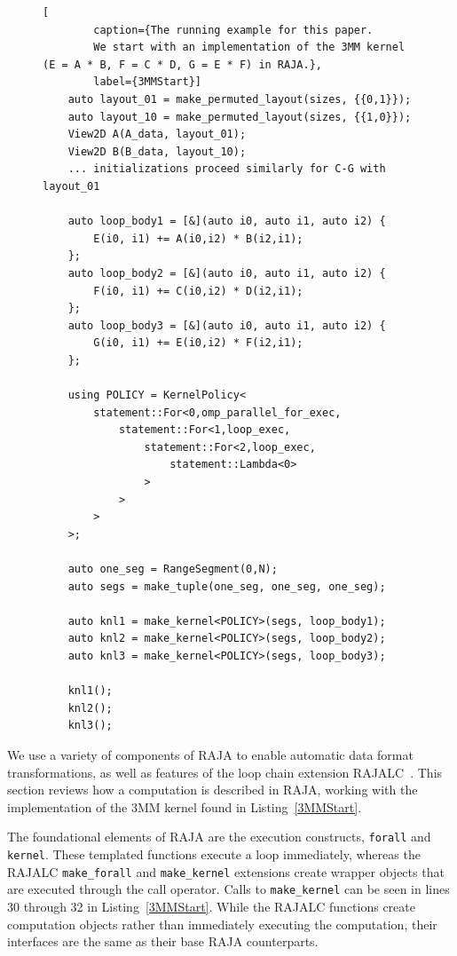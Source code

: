\documentclass[sigconf,review=true]{acmart}
\begin{document}
\begin{figure}
	\begin{lstlisting}[
		caption={The running example for this paper. 
		We start with an implementation of the 3MM kernel (E = A * B, F = C * D, G = E * F) in RAJA.},
		label={3MMStart}]
	auto layout_01 = make_permuted_layout(sizes, {{0,1}});
	auto layout_10 = make_permuted_layout(sizes, {{1,0}});
	View2D A(A_data, layout_01);
	View2D B(B_data, layout_10);
	... initializations proceed similarly for C-G with layout_01

	auto loop_body1 = [&](auto i0, auto i1, auto i2) {
		E(i0, i1) += A(i0,i2) * B(i2,i1);
	};
	auto loop_body2 = [&](auto i0, auto i1, auto i2) {
		F(i0, i1) += C(i0,i2) * D(i2,i1);
	};
	auto loop_body3 = [&](auto i0, auto i1, auto i2) {
		G(i0, i1) += E(i0,i2) * F(i2,i1);
	};
	
	using POLICY = KernelPolicy<
		statement::For<0,omp_parallel_for_exec,
			statement::For<1,loop_exec,
				statement::For<2,loop_exec,
					statement::Lambda<0>
				>
			>
		>
	>;

	auto one_seg = RangeSegment(0,N);
	auto segs = make_tuple(one_seg, one_seg, one_seg);

	auto knl1 = make_kernel<POLICY>(segs, loop_body1);
	auto knl2 = make_kernel<POLICY>(segs, loop_body2);
	auto knl3 = make_kernel<POLICY>(segs, loop_body3);

	knl1();
	knl2();
	knl3();
	\end{lstlisting}
\end{figure}


We use a variety of components of RAJA to enable automatic data format transformations, as well as features of the loop chain extension RAJALC~\cite{neth2021inter}. 
This section reviews how a computation is described in RAJA, working with the implementation of the 3MM kernel found in Listing~\ref{3MMStart}.

The foundational elements of RAJA are the execution constructs, \verb.forall. and \verb.kernel.. 
These templated functions execute a loop immediately, whereas the RAJALC \verb.make_forall. and \verb.make_kernel. extensions create wrapper objects that are executed through the call operator. 
Calls to \verb.make_kernel. can be seen in lines 30 through 32 in Listing~\ref{3MMStart}. 
While the RAJALC functions create computation objects rather than immediately executing the computation, their interfaces are the same as their base RAJA counterparts.
\end{document}
